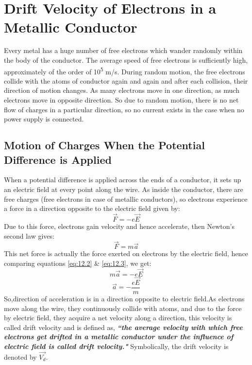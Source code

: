\section{Drift Velocity of Electrons in a Metallic Conductor}
Every metal has a huge number of free electrons which wander randomly within the body of the conductor. The average speed of free electrons is sufficiently high, approximately of the order of 10\textsuperscript{5} m/s. During random motion,
the free electrons collide with the atoms of conductor again and again and after each collision,  their direction of motion changes. As many electrons move in one direction, as much electrons move in opposite direction. So due to random motion, there is no net flow of charges  in a particular direction, so no current exists in the case when no power supply is connected.
\subsection*{Motion of Charges When the Potential Difference is Applied}
When a potential difference is applied across the ends of a conductor, it sets up an electric field at every point along the wire. As inside the conductor, there are free charges (free electrons in case of metallic conductors), so electrons experience a force in a direction opposite to the electric field given by:
\begin{equation}\label{eq:12.2}
    \vec{F} = -e\vec{E}
\end{equation}
Due to this force, electrons gain velocity and hence accelerate, then Newton’s second law gives:
\begin{equation}\label{eq:12.3}
    \vec{F} = m\vec{a}
\end{equation}
This net force is actually the force exerted on electrons by the electric field, hence comparing equations \ref{eq:12.2} \& \ref{eq:12.3}, we get:
\begin{equation}
    m\vec{a} = -e\vec{E} \nonumber
\end{equation}
\begin{equation}\label{eq:12.4}
    \vec{a} = -\frac{e\vec{E}}{m}
\end{equation}
So,direction of acceleration is in a direction opposite to electric field.As electrons move along the wire, they continuously collide with atoms, and due to the force by electric field, they acquire a net velocity along a direction, this velocity is called drift velocity and is defined as, \textit{\textbf{``the average velocity with which free electrons get drifted in a metallic conductor under the influence of electric field is called drift velocity."}} Symbolically, the drift velocity is denoted by $\vec{V_{d}}$.
